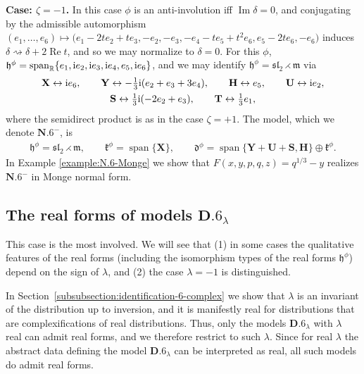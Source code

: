 \documentclass[pdftex]{sigma}
\DeclareMathOperator{\spanOperator}{span}
\renewcommand{\Im}{\operatorname{Im}}
\renewcommand{\Re}{\operatorname{Re}}
\newcommand{\Span}[1]{\spanOperator\{{#1}\}}
\newcommand{\bbR}{\mathbb{R}}
\newcommand{\mbH}{\mathbf{H}}
\newcommand{\mbS}{\mathbf{S}}
\newcommand{\mbT}{\mathbf{T}}
\newcommand{\mbU}{\mathbf{U}}
\newcommand{\mbX}{\mathbf{X}}
\newcommand{\mbY}{\mathbf{Y}}
\newcommand{\mfd} {\mathfrak{d}}
\newcommand{\mfh} {\mathfrak{h}}
\newcommand{\mfk} {\mathfrak{k}}
\newcommand{\mfm} {\mathfrak{m}}
\newcommand{\mfsl} {\mathfrak{sl}}
\numberwithin{equation}{section}
\begin{document}
\noindent \textbf{Case: $\zeta = - 1$.} In this case $\phi$ is an anti-involution iff $\Im \delta = 0$, and conjugating by the admissible automorphism $(e_1, \ldots, e_6) \mapsto \big(e_1 - 2 t e_2 + t e_3, -e_2, -e_3, -e_4 - t e_5 + t^2 e_6, e_5 - 2 t e_6, -e_6\big)$ induces $\delta \rightsquigarrow \delta + 2 \Re t$, and so we may normalize to $\delta = 0$. For this $\phi$, $\mfh^{\phi} = \spanOperator_{\bbR}\{e_1, {\rm i} e_2, {\rm i} e_3, {\rm i} e_4, e_5, {\rm i} e_6\}$, and we may identify $\mfh^{\phi} = \mfsl_2 \rightthreetimes \mfm$
via
\begin{gather*}
	\mbX \leftrightarrow {\rm i} e_6 , \qquad
	\mbY \leftrightarrow -\tfrac{1}{3} {\rm i} (e_2 + e_3 + 3 e_4) , \qquad
	\mbH \leftrightarrow e_5 , \qquad
	\mbU \leftrightarrow {\rm i} e_2 , \\
	\mbS \leftrightarrow \tfrac{1}{3} {\rm i} (-2 e_2 + e_3) , \qquad
	\mbT \leftrightarrow \tfrac{1}{3} e_1 ,
\end{gather*}
where the semidirect product is as in the case $\zeta = + 1$. The model, which we denote $\mathbf{N.6}^-$, is
\begin{gather*}
	\boxed{
 \mfh^{\phi} = \mfsl_2 \rightthreetimes \mfm , \qquad
		\mfk^{\phi} = \Span{\mbX} , \qquad
		\mfd^{\phi} = \Span{\mbY + \mbU + \mbS, \mbH} \oplus \mfk^{\phi} .
	}
\end{gather*}
In Example \ref{example:N.6-Monge} we show that $F(x, y, p, q, z) = q^{1 / 3} - y$ realizes $\mathbf{N.6}^-$ in Monge normal form.

\subsection{The real forms of models \texorpdfstring{$\mathbf{D.6}_{\lambda}$}{D.6-lambda}}\label{subsection:D.6-lambda-real}

This case is the most involved. We will see that (1) in some cases the qualitative features of the real forms (including the isomorphism types of the real forms $\mfh^{\phi}$) depend on the sign of $\lambda$, and (2) the case $\lambda = -1$ is distinguished.

In Section~\ref{subsubsection:identification-6-complex} we show that $\lambda$ is an invariant of the distribution up to inversion, and it is manifestly real for distributions that are complexifications of real distributions. Thus, only the models $\mathbf{D.6}_{\lambda}$ with $\lambda$ real can admit real forms, and we therefore restrict to such $\lambda$. Since for real $\lambda$ the abstract data defining the model $\mathbf{D.6}_{\lambda}$ can be interpreted as real, all such models do admit real forms.
\end{document}
